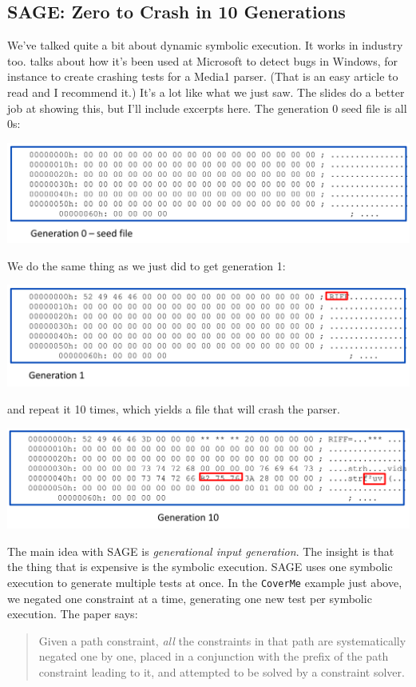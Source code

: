 \documentclass[11pt]{article}
\begin{document}
\subsection*{SAGE: Zero to Crash in 10 Generations}
We've talked quite a bit about dynamic symbolic execution. It works in industry too. \cite{godefroid12:_sage} talks about how it's been used at
Microsoft to detect bugs in Windows, for instance to create crashing tests for a Media1 parser. (That is an easy article to read and I recommend it.) It's a lot like what we just saw. The slides do a better job
at showing this, but I'll include excerpts here.
The generation 0 seed file is all 0s:

\includegraphics[width=.8\textwidth]{L09/gen0.png}

We do the same thing as we just did to get generation 1:

\includegraphics[width=.8\textwidth]{L09/gen1.png}

and repeat it 10 times, which yields a file that will crash the parser.

\includegraphics[width=.8\textwidth]{L09/gen10.png}

The main idea with SAGE is \emph{generational input generation}. The insight is that the thing that is expensive is the symbolic execution. SAGE uses one symbolic execution to generate multiple tests
at once. In the \texttt{CoverMe} example just above, we negated one constraint at a time, generating one new test per symbolic execution. The paper says:
\begin{quote}
  Given a path constraint,
  \emph{all} the constraints in that path are systematically negated one by one, placed in a conjunction with the prefix of the path constraint leading to it, and attempted to be solved by a constraint solver.
\end{quote}
\end{document}
